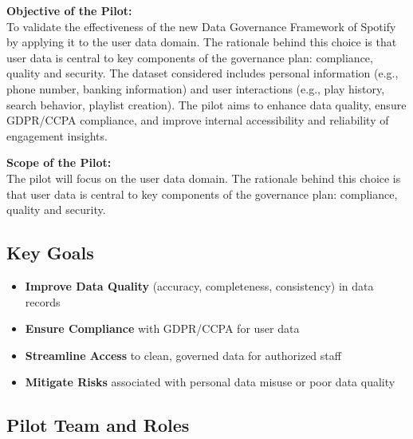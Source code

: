 \documentclass[11pt,a4paper,computermodern]{article}
\begin{document}
\textbf{Objective of the Pilot:}\\
To validate the effectiveness of the new Data Governance Framework of Spotify by applying it to the user data domain. The rationale behind this choice is that user data is central to key components of the governance plan: compliance, quality and security. The dataset considered includes personal information (e.g., phone number, banking information) and user interactions (e.g., play history, search behavior, playlist creation). The pilot aims to enhance data quality, ensure GDPR/CCPA compliance, and improve internal accessibility and reliability of engagement insights.

\noindent\textbf{Scope of the Pilot:}\\
The pilot will focus on the user data domain. The rationale behind this choice is that user data is central to key components of the governance plan: compliance, quality and security.


\subsection*{Key Goals}

\begin{itemize}[itemsep=5pt, parsep=0pt]
	\item \textbf{Improve Data Quality} (accuracy, completeness, consistency) in data records
	\item \textbf{Ensure Compliance} with GDPR/CCPA for user data
	\item \textbf{Streamline Access} to clean, governed data for authorized staff
	\item \textbf{Mitigate Risks} associated with personal data misuse or poor data quality
\end{itemize}


\subsection*{Pilot Team and Roles}
\end{document}
